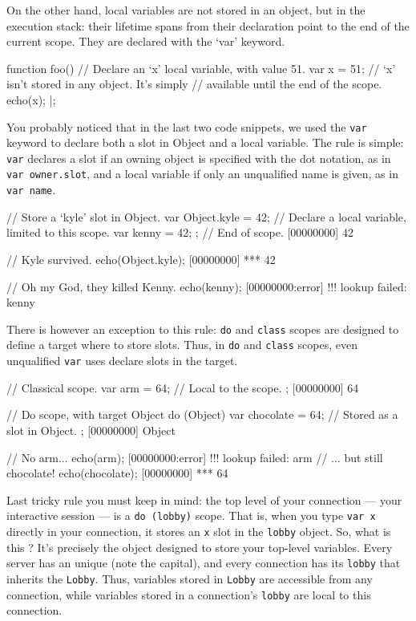 On the other hand, local variables are not stored in an object, but in
the execution stack: their lifetime spans from their declaration point
to the end of the current scope. They are declared with the `var'
keyword.

\begin{urbiscript}
function foo()
{
  // Declare an `x' local variable, with value 51.
  var x = 51;
  // `x' isn't stored in any object. It's simply
  // available until the end of the scope.
  echo(x);
}|;
\end{urbiscript}

You probably noticed that in the last two code snippets, we used the
\lstinline|var| keyword to declare both a slot in Object and a local
variable. The rule is simple: \lstinline|var| declares a slot if an
owning object is specified with the dot notation, as in %
\lstinline|var owner.slot|, and a local variable if only an
unqualified name is given, as in \lstinline|var name|.

\begin{urbiscript}
{
  // Store a `kyle' slot in Object.
  var Object.kyle = 42;
  // Declare a local variable, limited to this scope.
  var kenny = 42;
}; // End of scope.
[00000000] 42

// Kyle survived.
echo(Object.kyle);
[00000000] *** 42

// Oh my God, they killed Kenny.
echo(kenny);
[00000000:error] !!! lookup failed: kenny
\end{urbiscript}

There is however an exception to this rule: \lstinline|do| and
\lstinline|class| scopes are designed to define a target where to
store slots. Thus, in \lstinline|do| and \lstinline|class| scopes,
even unqualified \lstinline|var| uses declare slots in the target.

\begin{urbiscript}
// Classical scope.
{
  var arm = 64; // Local to the scope.
};
[00000000] 64

// Do scope, with target Object
do (Object)
{
  var chocolate = 64; // Stored as a slot in Object.
};
[00000000] Object

// No arm...
echo(arm);
[00000000:error] !!! lookup failed: arm
// ... but still chocolate!
echo(chocolate);
[00000000] *** 64
\end{urbiscript}

Last tricky rule you must keep in mind: the top level of your
connection --- your interactive session --- is a %
\lstinline|do (lobby)| scope. That is, when you type \lstinline|var x|
directly in your connection, it stores an \lstinline|x| slot in the
\lstinline|lobby| object. So, what is this ? It's precisely
the object designed to store your top-level variables. Every \urbi
server has an unique  (note the capital), and every
connection has its \lstinline|lobby| that inherits the
\lstinline|Lobby|. Thus, variables stored in \lstinline|Lobby| are
accessible from any connection, while variables stored in a
connection's \lstinline|lobby| are local to this connection.

